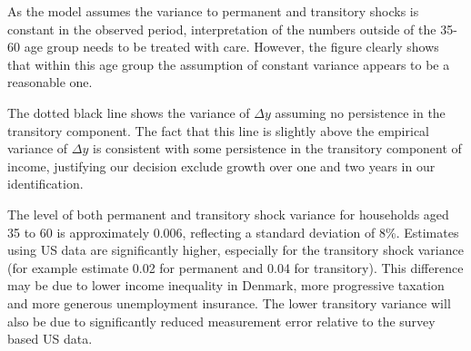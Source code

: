 \documentclass[titlepage]{\econtex}\newcommand{\texname}{IncomeUncertainty}
\begin{document}
As the model assumes the variance to permanent and transitory shocks is constant in the observed period, interpretation of the numbers outside of the 35-60 age group needs to be treated with care. However, the figure clearly shows that within this age group the assumption of constant variance appears to be a reasonable one.

The dotted black line shows the variance of $\Delta y$ assuming no persistence in the transitory component. The fact that this line is slightly above the empirical variance of $\Delta y$ is consistent with some persistence in the transitory component of income, justifying our decision exclude growth over one and two years in our identification.

The level of both permanent and transitory shock variance for households aged 35 to 60 is approximately 0.006, reflecting a standard deviation of 8\%. Estimates using US data are significantly higher, especially for the transitory shock variance (for example \cite{carroll_nature_1997} estimate 0.02 for permanent and 0.04 for transitory). This difference may be due to lower income inequality in Denmark, more progressive taxation and more generous unemployment insurance. The lower transitory variance will also be due to significantly reduced measurement error relative to the survey based US data. 
\end{document}
